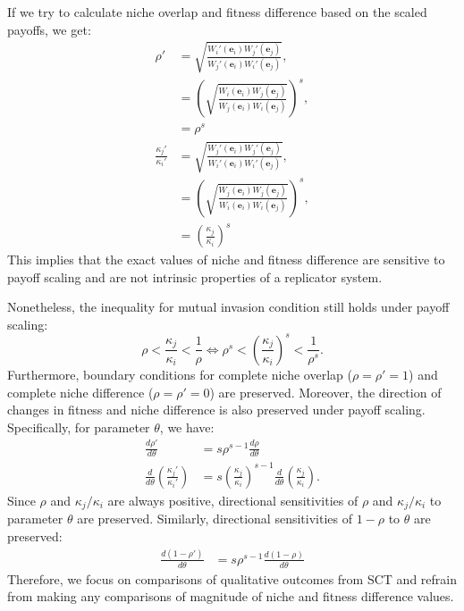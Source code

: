 \documentclass[12pt]{article}
\begin{document}
If we try to calculate niche overlap and fitness difference based on the scaled payoffs, we get:
\begin{align}
\rho' &= \sqrt{\frac{W_i'(\mathbf{e}_i) W_j'(\mathbf{e}_j)}{W_j'(\mathbf{e}_i) W_i'(\mathbf{e}_j) }},\\
&= \left(\sqrt{\frac{W_i(\mathbf{e}_i) W_j(\mathbf{e}_j)}{W_j(\mathbf{e}_i) W_i(\mathbf{e}_j)}}\right)^s,\\
&= \rho^s\\
\frac{\kappa_j'}{\kappa_i'} &= \sqrt{\frac{W_j'(\mathbf{e}_i)W_j'(\mathbf{e}_j) }{W_i'(\mathbf{e}_i) W_i'(\mathbf{e}_j)}},\\
&=  \left(\sqrt{\frac{W_j(\mathbf{e}_i)W_j(\mathbf{e}_j) }{W_i(\mathbf{e}_i) W_i(\mathbf{e}_j)}}\right)^s,\\
&= \left(\frac{\kappa_j}{\kappa_i}\right)^s
\end{align}
This implies that the exact values of niche and fitness difference are sensitive to payoff scaling and are not intrinsic properties of a replicator system.

Nonetheless, the inequality for mutual invasion condition still holds under payoff scaling:
\begin{equation}
\rho < \frac{\kappa_j}{\kappa_i} < \frac{1}{\rho} \iff \rho^s < \left(\frac{\kappa_j}{\kappa_i}\right)^s < \frac{1}{\rho^s}.
\end{equation}
Furthermore, boundary conditions for complete niche overlap ($\rho=\rho'=1$) and complete niche difference ($\rho=\rho'=0$) are preserved.
Moreover, the direction of changes in fitness and niche difference is also preserved under payoff scaling.
Specifically, for parameter $\theta$, we have:
\begin{align}
\frac{d\rho'}{d\theta} &= s \rho^{s-1} \frac{d\rho}{d\theta}\\ 
\frac{d}{d\theta}\left(\frac{\kappa_j'}{\kappa_i'}\right) &= s \left(\frac{\kappa_j}{\kappa_i}\right)^{s-1} \frac{d}{d\theta}\left(\frac{\kappa_j}{\kappa_i}\right).
\end{align}
Since $\rho$ and $\kappa_j/\kappa_i$ are always positive, directional sensitivities of $\rho$ and $\kappa_j/\kappa_i$ to parameter $\theta$ are preserved.
Similarly, directional sensitivities of $1-\rho$ to $\theta$ are preserved:
\begin{align}
\frac{d(1-\rho')}{d\theta} &= s \rho^{s-1} \frac{d(1-\rho)}{d\theta}
\end{align}
Therefore, we focus on comparisons of qualitative outcomes from SCT and refrain from making any comparisons of magnitude of niche and fitness difference values.
\end{document}
